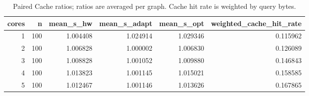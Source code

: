 \begin{table}[htbp]
\centering
\caption{Paired Cache ratios; ratios are averaged per graph. Cache hit rate is weighted by query bytes.}
\begin{tabular}{rrrrrr}
\toprule
cores & n & mean\_s\_hw & mean\_s\_adapt & mean\_s\_opt & weighted\_cache\_hit\_rate \\
\midrule
1 & 100 & 1.004408 & 1.024914 & 1.029346 & 0.115962 \\
2 & 100 & 1.006828 & 1.000002 & 1.006830 & 0.126089 \\
3 & 100 & 1.008828 & 1.001052 & 1.009880 & 0.146843 \\
4 & 100 & 1.013823 & 1.001145 & 1.015021 & 0.158585 \\
5 & 100 & 1.012467 & 1.001146 & 1.013626 & 0.167865 \\
\bottomrule
\end{tabular}
\end{table}
